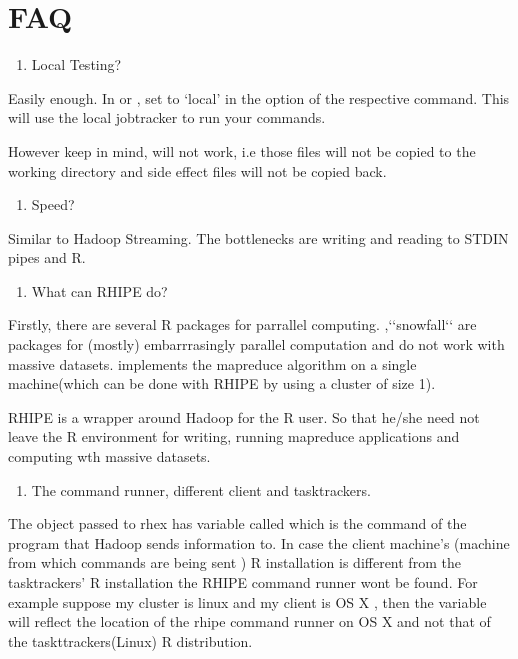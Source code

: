\documentclass[letterpaper,10pt,english]{manual}
\begin{document}
\resetcurrentobjects
\hypertarget{--doc-FAQ}{}

\chapter{FAQ}
\begin{enumerate}
\item {} 
Local Testing?

\end{enumerate}

Easily enough. In  or , set  to
`local' in the  option of the respective command. This will
use the local jobtracker to run your commands.

However keep in mind,
 will not work, i.e those files will not be copied to the
working directory and side effect files will not be copied back.
\begin{enumerate}
\item {} 
Speed?

\end{enumerate}

Similar to Hadoop Streaming. The bottlenecks are writing and reading to STDIN
pipes and R.
\begin{enumerate}
\item {} 
What can RHIPE do?

\end{enumerate}

Firstly, there are several R packages for parrallel computing. ,{}`{}`snowfall{}`{}`
are packages for (mostly) embarrrasingly parallel computation and do not work
with massive datasets.  implements the mapreduce algorithm on a
single machine(which can be done with RHIPE by using a cluster of size 1).

RHIPE is a wrapper around Hadoop for the R user. So that he/she need not leave
the R environment for writing, running mapreduce applications and computing wth
massive datasets.
\begin{enumerate}
\item {} 
The command runner, different client and tasktrackers.

\end{enumerate}

The object passed to rhex has variable called  which is the
command of the program that Hadoop sends information to. In case the client
machine's (machine from which commands are being sent ) R installation is different from the
tasktrackers' R installation the RHIPE command runner wont be found. For example
suppose my cluster is linux and my client is OS X , then the 
variable will reflect the location of the rhipe command runner on OS X and not
that of the taskttrackers(Linux) R distribution.
\end{document}
